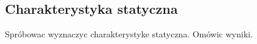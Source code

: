 \subsection{Charakterystyka statyczna}
\label{lab:zad9}



\ifdefined\CompileFigures
%    
\fi

Spróbowac wyznaczyc charakterystyke statyczna. Omówic wyniki.

\newpage
